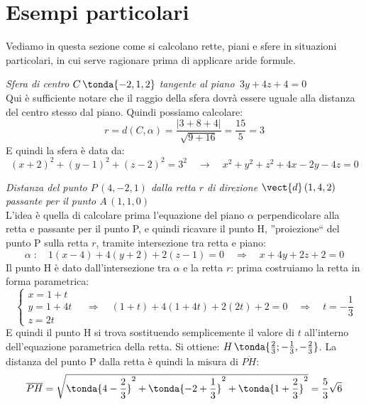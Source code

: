 \section{Esempi particolari}

Vediamo in questa sezione come si calcolano rette, piani e sfere in situazioni particolari, in cui serve ragionare prima di applicare aride formule.

\begin{esempio}
 \emph{Sfera di centro \(C\,\tonda{-2,1,2}\) tangente al piano \,\(3y+4z+4=0\)}\\[7pt]
 Qui è sufficiente notare che il raggio della sfera dovrà essere uguale alla distanza del centro stesso dal piano. Quindi possiamo calcolare:
 \[r = d(C,\alpha) = \frac{|3+8+4|}{\sqrt{9+16}} = \frac{15}{5} = 3\]
 E quindi la sfera è data da:
 \[(x+2)^2+(y-1)^2+(z-2)^2=3^2 \quad \longrightarrow \quad x^2+y^2+z^2+4x-2y-4z=0\]
\end{esempio}

\begin{esempio}
 \emph{Distanza del punto \(P\,(4,-2,1)\) dalla retta \(r\) di direzione \(\vect{d} \, (1,4,2)\) passante per il punto \(A\,(1,1,0)\)}\\[7pt]
 L'idea è quella di calcolare prima l'equazione del piano \(\alpha\) perpendicolare alla retta e passante per il punto P, e quindi ricavare il punto H, ''proiezione`` del punto P sulla retta \(r\), tramite intersezione tra retta e piano:
 \[\alpha \;: \quad 1(x-4)+4(y+2)+2(z-1)=0 \quad \Rightarrow \quad x+4y+2z+2=0\]
 Il punto H è dato dall'intersezione tra \(\alpha\) e la retta \(r\): prima costruiamo la retta in forma parametrica:
 \[\begin{cases}
x = 1+t \\
y = 1+4t \\
z = 2t
\end{cases} \quad \Longrightarrow \quad (1+t)+4(1+4t)+2(2t)+2=0 \quad \Rightarrow \quad t = -\frac{1}{3}\]
E quindi il punto H si trova sostituendo semplicemente il valore di \(t\) all'interno dell'equazione parametrica della retta. Si ottiene: \(H\,\tonda{\frac{2}{3};-\frac{1}{3},-\frac{2}{3}}\). La distanza del punto P dalla retta è quindi la misura di \(\overline{PH}\):
\[\overline{PH} = \sqrt{\tonda{4-\frac{2}{3}}^2+\tonda{-2+\frac{1}{3}}^2+\tonda{1+\frac{2}{3}}^2} = \frac{5}{3}\sqrt{6}\]
\end{esempio}

